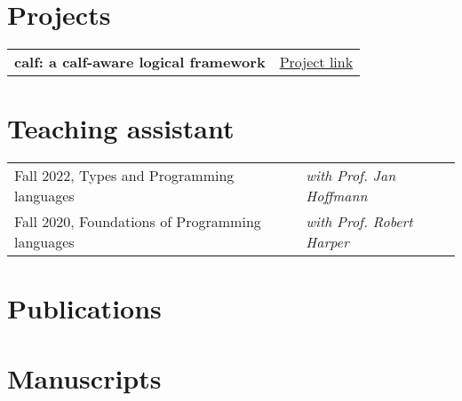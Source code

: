 \documentclass[a4paper,12pt]{article}
\begin{document}
\section{Projects}

\begin{tabularx}{\linewidth}{ @{}l r@{} }
\textbf{calf: a \textbf{c}alf-\textbf{a}ware \textbf{l}ogical \textbf{f}ramework} & \hfill \href{https://github.com/jonsterling/agda-calf}{Project link}
\end{tabularx}

\section{Teaching assistant} 

\begin{tabularx}{\linewidth}{ @{}l l@{} }
  Fall 2022, Types and Programming languages & \emph{with Prof. Jan Hoffmann}\\
  Fall 2020, Foundations of Programming languages & \emph{with Prof. Robert Harper} 
\end{tabularx}



\section{Publications}
\begin{refsection}
\nocite{*}
\printbibliography[heading=none]
\end{refsection}

\section{Manuscripts}
\begin{refsection}
\nocite{*}
\printbibliography[heading=none]
\end{refsection}

\vfill
{}
\end{document}
